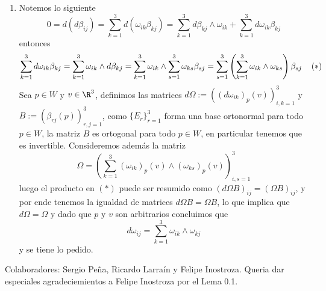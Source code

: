 \documentclass{article}
\begin{document}
\begin{enumerate}
    \item Notemos lo siguiente
    \begin{equation*}
        0=d(d\beta_{ij})=\sum_{k=1}^{3}d(\omega_{ik}\beta_{kj})
        =\sum_{k=1}^{3}d\beta_{kj}\land\omega_{ik}+\sum_{k=1}^{3}d\omega_{ik}\beta_{kj}
    \end{equation*}
    entonces
    \begin{equation*}
        \sum_{k=1}^{3}d\omega_{ik}\beta_{kj}=\sum_{k=1}^{3}\omega_{ik}\land d\beta_{kj}
        =\sum_{k=1}^{3}\omega_{ik}\land\sum_{s=1}^{3}\omega_{ks}\beta_{sj}
        =\sum_{s=1}^{3}\left(\sum_{k=1}^{3}\omega_{ik}\land\omega_{ks}\right)\beta_{sj}
        \hspace{4mm}(*)
    \end{equation*}
    Sea $p\in W$ y $v\in\R^{3}$, definimos las matrices $d\Omega:=((d\omega_{ik})_{p}(v))
    _{i,k=1}^{3}$ y $B:=(\beta_{rj}(p))_{r,j=1}^{3}$, como $\{E_{r}\}_{r=1}^{3}$ forma una base
    ortonormal para todo $p\in W$, la matriz $B$ es ortogonal para todo $p\in W$, en particular 
    tenemos que es invertible. Consideremos además la matriz
    \begin{equation*}
        \Omega=\left(\sum_{k=1}^{3}(\omega_{ik})_{p}(v)\land(\omega_{ks})_{p}(v)\right)
        _{i,s=1}^{3}
    \end{equation*}
    luego el producto en $(*)$ puede ser resumido como $(d\Omega B)_{ij}=(\Omega B)_{ij}$, 
    y por ende tenemos la igualdad de matrices $d\Omega B=\Omega B$, lo que implica que
    $d\Omega=\Omega$ y dado que $p$ y $v$ son arbitrarios concluimos que
    \begin{equation*}
        d\omega_{ij}=\sum_{k=1}^{3}\omega_{ik}\land\omega_{kj}
    \end{equation*}
    y se tiene lo pedido.
\end{enumerate}

\vspace{2mm}
\noindent Colaboradores: Sergio Peña, Ricardo Larraín y Felipe Inostroza. Queria dar especiales
agradeciemientos a Felipe Inostroza por el Lema 0.1.

\end{document}
